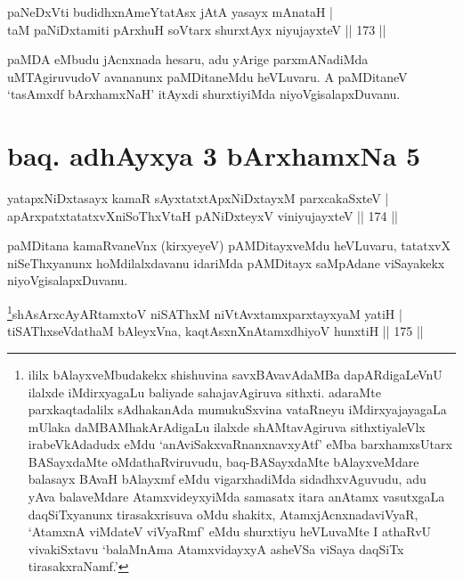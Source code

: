 
\begin{shl}
paNeDxVti budidhxnAmeYtatAsx jAtA yasayx mAnataH |\\
taM paNiDxtamiti pArxhuH soV\s tarx shurxtAyx niyujayxteV \hfill || 173 ||
\end{shl}

\begin{artha}
paMDA eMbudu jAcnxnada hesaru, adu yArige parxmANadiMda uMTAgiruvudoV avananunx paMDitaneMdu heVLuvaru. A paMDitaneV `tasAmxdf bArxhamxNaH' itAyxdi shurxtiyiMda niyoVgisalapxDuvanu.
\end{artha}

\section*{baq. adhAyxya 3 \ndash  bArxhamxNa 5}

\begin{shl}
yatapxNiDxtasayx kamaR sAyxtatxtApxNiDxtayxM parxcakaSxteV |\\
apArxpatxtatatxvXniSoThxV\s taH pANiDxteyxV viniyujayxteV \hfill || 174 ||
\end{shl}

\begin{artha}
paMDitana kamaRvaneVnx (kirxyeyeV) pAMDitayxveMdu heVLuvaru, tatatxvX niSeThxyanunx hoMdilalxdavanu idariMda pAMDitayx saMpAdane viSayakekx niyoVgisalapxDuvanu.
\end{artha}



\begin{shl}
\footnote{ililx bAlayxveMbudakekx shishuvina savxBAvavAdaMBa dapARdigaLeVnU ilalxde iMdirxyagaLu baliyade sahajavAgiruva sithxti. adaraMte parxkaqtadalilx sAdhakanAda mumukuSxvina vataRneyu iMdirxyajayagaLa mUlaka daMBAMhakArAdigaLu ilalxde shAMtavAgiruva sithxtiyaleVlx irabeVkAdadudx eMdu `anAviSakxvaRnanxnavxyAtf' eMba barxhamxsUtarx BASayxdaMte oMdathaRviruvudu, baq-BASayxdaMte bAlayxveMdare balasayx BAvaH bAlayxmf eMdu vigarxhadiMda sidadhxvAguvudu, adu yAva balaveMdare AtamxvideyxyiMda samasatx itara anAtamx vasutxgaLa daqSiTxyanunx  tirasakxrisuva oMdu shakitx, AtamxjAcnxnadaviVyaR, `AtamxnA viMdateV viVyaRmf' eMdu shurxtiyu heVLuvaMte I athaRvU vivakiSxtavu `balaMnAma AtamxvidayxyA asheVSa viSaya daqSiTx tirasakxraNamf.'}shAsArxcAyARtamxtoV niSAThxM niVtAvx\s \s tamxparxtayxyaM yatiH |\\
tiSAThxseVdathaM bAleyxVna, kaqtAsxnXnAtamxdhiyoV hunxtiH \hfill || 175 ||
\end{shl}


